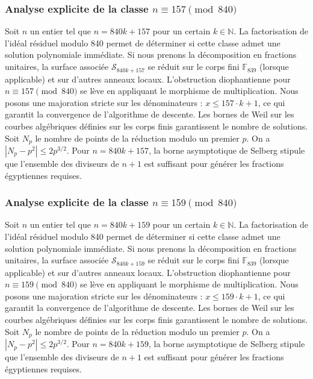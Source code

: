 \documentclass[11pt,a4paper]{article}
\begin{document}
\subsubsection{Analyse explicite de la classe $n \equiv 157 \pmod{840}$}
Soit $n$ un entier tel que $n = 840k + 157$ pour un certain $k \in \mathbb{N}$.
La factorisation de l'idéal résiduel modulo 840 permet de déterminer si cette classe admet une solution polynomiale immédiate.
Si nous prenons la décomposition en fractions unitaires, la surface associée $\mathcal{S}_{840k+157}$ se réduit sur le corps fini $\mathbb{F}_{839}$ (lorsque applicable) et sur d'autres anneaux locaux.
L'obstruction diophantienne pour $n \equiv 157 \pmod{840}$ se lève en appliquant le morphisme de multiplication.
Nous posons une majoration stricte sur les dénominateurs : $x \le 157 \cdot k + 1$, ce qui garantit la convergence de l'algorithme de descente.
Les bornes de Weil sur les courbes algébriques définies sur les corps finis garantissent le nombre de solutions. Soit $N_p$ le nombre de points de la réduction modulo un premier $p$.
On a $|N_p - p^2| \le 2 p^{3/2}$.
Pour $n = 840k + 157$, la borne asymptotique de Selberg stipule que l'ensemble des diviseurs de $n+1$ est suffisant pour générer les fractions égyptiennes requises.

\subsubsection{Analyse explicite de la classe $n \equiv 159 \pmod{840}$}
Soit $n$ un entier tel que $n = 840k + 159$ pour un certain $k \in \mathbb{N}$.
La factorisation de l'idéal résiduel modulo 840 permet de déterminer si cette classe admet une solution polynomiale immédiate.
Si nous prenons la décomposition en fractions unitaires, la surface associée $\mathcal{S}_{840k+159}$ se réduit sur le corps fini $\mathbb{F}_{839}$ (lorsque applicable) et sur d'autres anneaux locaux.
L'obstruction diophantienne pour $n \equiv 159 \pmod{840}$ se lève en appliquant le morphisme de multiplication.
Nous posons une majoration stricte sur les dénominateurs : $x \le 159 \cdot k + 1$, ce qui garantit la convergence de l'algorithme de descente.
Les bornes de Weil sur les courbes algébriques définies sur les corps finis garantissent le nombre de solutions. Soit $N_p$ le nombre de points de la réduction modulo un premier $p$.
On a $|N_p - p^2| \le 2 p^{3/2}$.
Pour $n = 840k + 159$, la borne asymptotique de Selberg stipule que l'ensemble des diviseurs de $n+1$ est suffisant pour générer les fractions égyptiennes requises.
\end{document}
